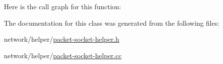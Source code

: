 Here is the call graph for this function\+:




The documentation for this class was generated from the following files\+:\begin{DoxyCompactItemize}
\item 
network/helper/\hyperlink{packet-socket-helper_8h}{packet-\/socket-\/helper.\+h}\item 
network/helper/\hyperlink{packet-socket-helper_8cc}{packet-\/socket-\/helper.\+cc}\end{DoxyCompactItemize}
